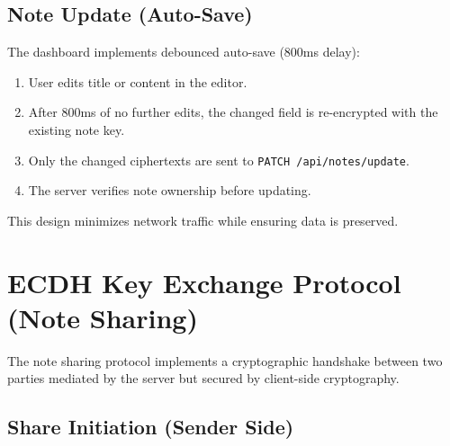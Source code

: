 \subsection{Note Update (Auto-Save)}

The dashboard implements debounced auto-save (800ms delay):
\begin{enumerate}
    \item User edits title or content in the editor.
    \item After 800ms of no further edits, the changed field is re-encrypted with the existing note key.
    \item Only the changed ciphertexts are sent to \texttt{PATCH /api/notes/update}.
    \item The server verifies note ownership before updating.
\end{enumerate}

This design minimizes network traffic while ensuring data is preserved.

\section{ECDH Key Exchange Protocol (Note Sharing)}

The note sharing protocol implements a cryptographic handshake between two parties mediated by the server but secured by client-side cryptography.

\subsection{Share Initiation (Sender Side)}

